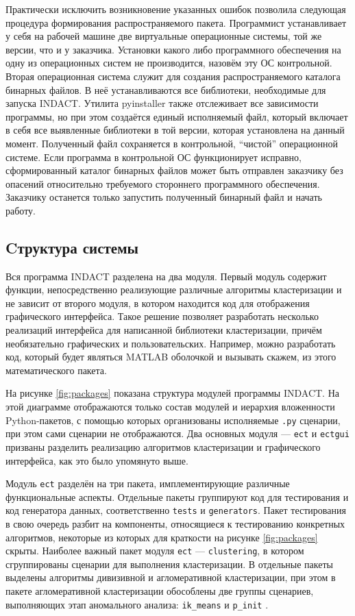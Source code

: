 \documentclass[12pt]{diploma}
\begin{document}
	Практически исключить возникновение указанных ошибок позволила следующая процедура формирования распространяемого пакета. Программист устанавливает у себя на рабочей машине две виртуальные операционные системы, той же версии, что и у заказчика. Установки какого либо программного обеспечения на одну из операционных систем не производится, назовём эту ОС контрольной. Вторая операционная система служит для создания распространяемого каталога бинарных файлов. В неё устанавливаются все библиотеки, необходимые для запуска INDACT. Утилита pyinstaller \cite{Pyinstaller} также отслеживает все зависимости программы, но при этом создаётся единый исполняемый файл, который включает в себя все выявленные библиотеки в той версии, которая установлена на данный момент. Полученный файл сохраняется в контрольной, ``чистой'' операционной системе. Если программа в контрольной ОС функционирует исправно, сформированный каталог бинарных файлов может быть отправлен заказчику без опасений относительно требуемого стороннего программного обеспечения. Заказчику останется только запустить полученный бинарный файл и начать работу.
	
	\subsection{Cтруктура системы}
	Вся программа INDACT разделена на два модуля. Первый модуль содержит функции, непосредственно реализующие различные алгоритмы кластеризации и не зависит от второго модуля, в котором находится код для отображения графического интерфейса. Такое решение позволяет разработать несколько реализаций интерфейса для написанной библиотеки кластеризации, причём необязательно графических и пользовательских. Например, можно разработать код, который будет являться MATLAB оболочкой и вызывать скажем, \dePDDP из этого математического пакета. 
	
	На рисунке \ref{fig:packages} показана структура модулей программы INDACT. На этой диаграмме отображаются только состав модулей и иерархия вложенности Python-пакетов, с помощью которых организованы исполняемые \texttt{.py} сценарии, при этом сами сценарии не отображаются. Два основных модуля --- \texttt{ect} и \texttt{ectgui} призваны разделить реализацию алгоритмов кластеризации и графического интерфейса, как это было упомянуто выше. 
	
	Модуль \texttt{ect} разделён на три пакета, имплементирующие различные функциональные аспекты. Отдельные пакеты группируют код для тестирования и код генератора данных, соответственно \texttt{tests} и \texttt{generators}. Пакет тестирования в свою очередь разбит на компоненты, относящиеся к тестированию конкретных алгоритмов, некоторые из которых для краткости на рисунке \ref{fig:packages} скрыты. Наиболее важный пакет модуля \texttt{ect} --- \texttt{clustering}, в котором сгруппированы сценарии для выполнения кластеризации. В отдельные пакеты выделены алгоритмы дивизивной и агломеративной кластеризации, при этом в пакете агломеративной кластеризации обособлены две группы сценариев, выполняющих этап аномального анализа: \texttt{ik\_means} и \texttt{p\_init} .
	
\end{document}
